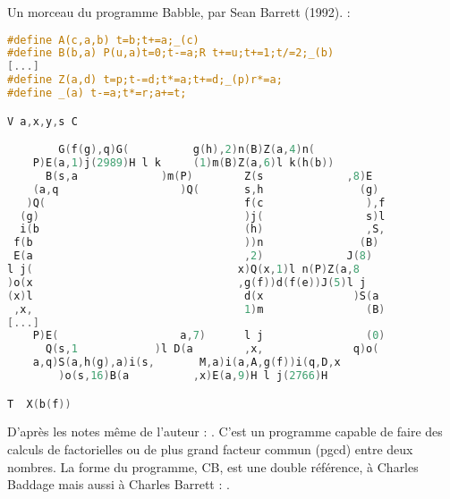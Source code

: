 \documentclass[12pt]{article} %
\begin{document}
\newpage
Un morceau du programme Babble, par Sean Barrett (1992). :
\begin{lstlisting}[language=C, caption={Babble}, label={code:babble}]
#define A(c,a,b) t=b;t+=a;_(c)
#define	B(b,a) P(u,a)t=0;t-=a;R t+=u;t+=1;t/=2;_(b)
[...]
#define Z(a,d) t=p;t-=d;t*=a;t+=d;_(p)r*=a;
#define _(a) t-=a;t*=r;a+=t;

V a,x,y,s C

	    G(f(g),q)G(          g(h),2)n(B)Z(a,4)n(
	P)E(a,1)j(2989)H l k     (1)m(B)Z(a,6)l k(h(b))
      B(s,a             )m(P)        Z(s             ,8)E
    (a,q                   )Q(       s,h               (g)
   )Q(                               f(c                ),f
  (g)                                )j(                s)l
  i(b                                (h)                ,S,
 f(b                                 ))n               (B)
 E(a                                 ,2)             J(8)
l j(                                x)Q(x,1)l n(P)Z(a,8
)o(x                                ,g(f))d(f(e))J(5)l j
(x)l                                 d(x              )S(a
 ,x,                                 1)m                (B)
[...]
    P)E(                   a,7)      l j                (0)
      Q(s,1            )l D(a        ,x,              q)o(
	a,q)S(a,h(g),a)i(s,       M,a)i(a,A,g(f))i(q,D,x
	    )o(s,16)B(a          ,x)E(a,9)H l j(2766)H

T  X(b(f))
\end{lstlisting}

D'après les notes même de l'auteur :  \cite{SBarrett-Babble}. C'est un programme capable de faire des calculs de factorielles ou de plus grand facteur commun (\acrshort{pgcd}) entre deux nombres. La forme du programme, CB, est une double référence, à Charles Baddage mais aussi à Charles Barrett :  \cite{SBarrett-Babble}.
\end{document}

